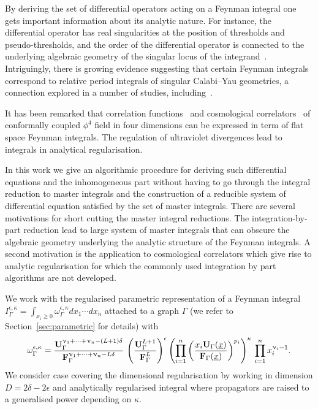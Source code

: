 \documentclass[a4paper,12pt]{article}
\numberwithin{equation}{section}
\numberwithin{figure}{section}
\begin{document}
\medskip
By deriving the set of differential operators acting on a Feynman integral one
gets important information about its analytic nature. For instance, 
the differential  operator has real singularities at the position of
 thresholds and pseudo-thresholds, and the order of the differential
operator is connected to the underlying algebraic geometry of the singular locus
of the integrand~\cite{Doran:2023yzu}. Intriguingly, there is  growing evidence suggesting that certain
Feynman integrals correspond to relative period integrals of singular
Calabi--Yau geometries, a connection explored in a number
of studies,
including~\cite{Brown:2009ta,Bloch:2014qca,Bloch:2016izu,Bourjaily:2018ycu,Bourjaily:2019hmc,Bourjaily:2018yfy,Klemm:2019dbm,Bonisch:2020qmm,Bonisch:2021yfw,Bourjaily:2022bwx,Forum:2022lpz,Duhr:2022pch,Frellesvig:2023PM}.

It has been remarked that correlation
functions~\cite{Heckelbacher:2022hbq}
and cosmological correlators~\cite{Heckelbacher:2022fbx,Chowdhury:2023arc}
of conformally
coupled $\phi^4$ field in four dimensions can be expressed in term of
flat space Feynman integrals.  The regulation of ultraviolet
divergences lead to integrals in analytical regularisation.

In this work we give an algorithmic procedure for deriving such
differential equations and the inhomogeneous part without having to go through the integral
reduction to master integrals and the construction of a reducible
system of differential equation satisfied by the set of master
integrals.  There are several motivations for short cutting the master
integral reductions. The integration-by-part reduction lead to large
system of master integrals that can obscure the algebraic
geometry underlying the analytic
structure of the Feynman integrals.
A second motivation is the application to
cosmological correlators which give rise to analytic regularisation
for which the commonly used integration by part algorithms are not  developed. 

We work with the regularised parametric representation of a Feynman integral $
I_\Gamma^{\epsilon,\kappa}=\int_{x_i\geq0}  \omega_\Gamma^{\epsilon,\kappa} dx_1\cdots dx_n$ attached to a
graph $\Gamma$ (we refer to 
Section~\ref{sec:parametric} for details)
with
\begin{equation}\label{e:OmegaAnRegIntro}
  \omega^{\epsilon,\kappa}_\Gamma = { \textbf{U}_\Gamma ^{\upnu_1+\cdots+\upnu_n-(L+1)\delta}  \over \textbf{F}_\Gamma ^{\upnu_1+\cdots+\upnu_n-L\delta} }\, \left(\textbf{U}_\Gamma^{L+1}\over \textbf{F}_\Gamma^{L}\right)^{\epsilon} 
  \left(\prod_{i=1}^n \left(x_i \textbf{U}_\Gamma(\underline x)\over
      \textbf{F}_\Gamma(\underline x)\right)^{p_i}\right)^{\kappa} \, \prod_{i=1}^n x_i^{\upnu_i-1} .
\end{equation}
We consider case covering
the dimensional regularisation by working in dimension
$D=2\delta-2\epsilon$ and analytically regularised integral where
propagators are raised to a generalised power depending on $\kappa$.
\end{document}
